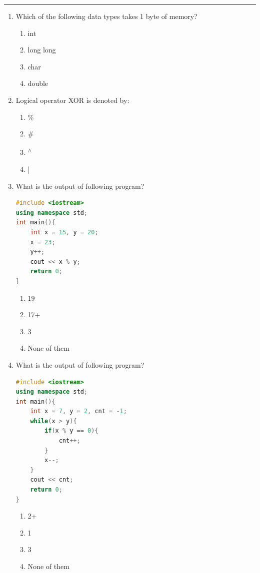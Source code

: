 \documentclass[10pt]{article}
\begin{document}
\medskip\hrule
\begin{enumerate}

\item Which of the following data types takes 1 byte of memory?
\begin{multicols}{4}
\begin{enumerate}
    \item int
    \item long long
    \item char 
    \item double
\end{enumerate}
\end{multicols}

\item Logical operator XOR is denoted by:
\begin{multicols}{4}
\begin{enumerate}
    \item \%
    \item \#
    \item \textsuperscript{$\wedge$} 
    \item |
\end{enumerate}
\end{multicols}



\item What is the output of following program?
\begin{lstlisting}[language=C++]
#include <iostream>
using namespace std;
int main(){
    int x = 15, y = 20;
    x = 23;
    y++;
    cout << x % y;
    return 0;
}

\end{lstlisting}
\begin{multicols}{4}
\begin{enumerate}
    \item 19
    \item 17+
    \item 3
    \item None of them
\end{enumerate}
\end{multicols}

\item What is the output of following program?
\begin{lstlisting}[language=C++]
#include <iostream>
using namespace std;
int main(){
    int x = 7, y = 2, cnt = -1;
    while(x > y){
        if(x % y == 0){
            cnt++;
        }
        x--;
    }
    cout << cnt;
    return 0;
}
\end{lstlisting}
\begin{multicols}{4}
\begin{enumerate}
    \item 2+
    \item 1
    \item 3
    \item None of them
\end{enumerate}
\end{multicols}



\end{enumerate}
\end{document}
